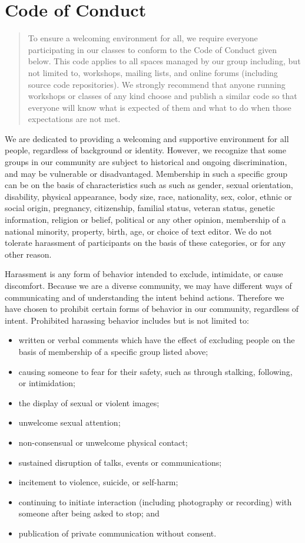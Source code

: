 \documentclass[10pt,statementpaper]{memoir}
\begin{document}
\chapter{Code of Conduct}\label{code-of-conduct}

\begin{quote}
To ensure a welcoming environment for all, we require everyone
participating in our classes to conform to the Code of Conduct given
below. This code applies to all spaces managed by our group including,
but not limited to, workshops, mailing lists, and online forums
(including source code repositories). We strongly recommend that anyone
running workshops or classes of any kind choose and publish a similar
code so that everyone will know what is expected of them and what to do
when those expectations are not met.
\end{quote}

We are dedicated to providing a welcoming and supportive environment for
all people, regardless of background or identity. However, we recognize
that some groups in our community are subject to historical and ongoing
discrimination, and may be vulnerable or disadvantaged. Membership in
such a specific group can be on the basis of characteristics such as
such as gender, sexual orientation, disability, physical appearance,
body size, race, nationality, sex, color, ethnic or social origin,
pregnancy, citizenship, familial status, veteran status, genetic
information, religion or belief, political or any other opinion,
membership of a national minority, property, birth, age, or choice of
text editor. We do not tolerate harassment of participants on the basis
of these categories, or for any other reason.

Harassment is any form of behavior intended to exclude, intimidate, or
cause discomfort. Because we are a diverse community, we may have
different ways of communicating and of understanding the intent behind
actions. Therefore we have chosen to prohibit certain forms of behavior
in our community, regardless of intent. Prohibited harassing behavior
includes but is not limited to:

\begin{itemize}
\item
  written or verbal comments which have the effect of excluding people
  on the basis of membership of a specific group listed above;
\item
  causing someone to fear for their safety, such as through stalking,
  following, or intimidation;
\item
  the display of sexual or violent images;
\item
  unwelcome sexual attention;
\item
  non-consensual or unwelcome physical contact;
\item
  sustained disruption of talks, events or communications;
\item
  incitement to violence, suicide, or self-harm;
\item
  continuing to initiate interaction (including photography or
  recording) with someone after being asked to stop; and
\item
  publication of private communication without consent.
\end{itemize}
\end{document}
